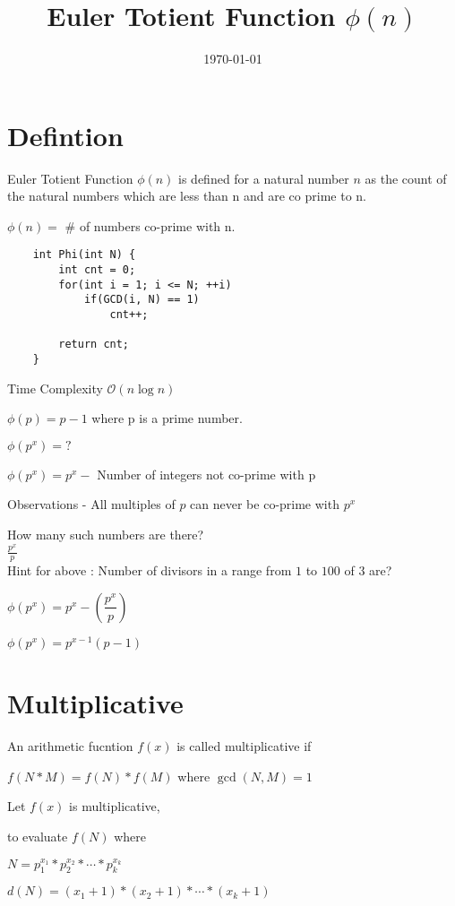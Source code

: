 \documentclass[12pt]{article}
\title{Euler Totient Function $\phi(n)$}{}
\author{}
\date{\today}
\begin{document}
\maketitle
	\section{Defintion}
		Euler Totient Function $\phi(n)$ is defined for a natural number $n$ as the count of the natural numbers which are less than n and are co prime to n.

		$\phi(n) =$ \# of numbers co-prime with n.

\begin{lstlisting}
	int Phi(int N) {
		int cnt = 0;
		for(int i = 1; i <= N; ++i)
			if(GCD(i, N) == 1)
				cnt++;
		
		return cnt;
	}
\end{lstlisting}


	Time Complexity $\mathcal{O}(n\log{n})$

	$\phi(p) = p-1$ where p is a prime number.

	$\phi(p^{x}) = ?$

	$\phi(p^{x}) = p^{x} - $ Number of integers not co-prime with p

	Observations - All multiples of $p$ can never be co-prime with $p^{x}$

	How many such numbers are there? \\
			
	$\frac{p^{x}}{p}$ \\
	
	Hint for above : Number of divisors in a range from $1$ to $100$ of $3$ are?

	$\phi(p^x) = p^x - (\dfrac{p^x}{p})$

	$\phi(p^x) = p^{x-1} (p - 1)$


	\section {Multiplicative}
		An arithmetic fucntion $f(x)$ is called multiplicative if 

		$f(N * M) = f(N) * f(M)$ where $\gcd(N,M) = 1$


		Let $f(x)$ is multiplicative,

		to evaluate $f(N)$ where 

		$N = p_{1}^{x_1} * p_{2}^{x_2} * \cdots * p_{k}^{x_k}$

		
		$d(N) = (x_1 + 1) * (x_2 + 1) * \cdots * (x_k + 1)$
\end{document}
